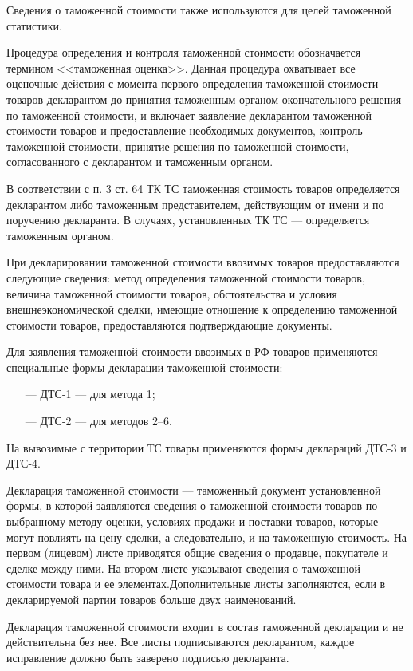 Сведения о таможенной стоимости также используются для целей таможенной статистики.

Процедура определения и контроля таможенной стоимости обозначается термином <<таможенная оценка>>. Данная процедура охватывает все оценочные действия с момента первого определения таможенной стоимости товаров декларантом до принятия таможенным органом окончательного решения по таможенной стоимости, и включает заявление декларантом таможенной стоимости товаров и предоставление необходимых документов, контроль таможенной стоимости, принятие решения по таможенной стоимости, согласованного с декларантом и таможенным органом.

В соответствии с п. 3 ст. 64 ТК ТС таможенная стоимость товаров определяется декларантом либо таможенным представителем, действующим от имени и по поручению декларанта. В случаях, установленных ТК ТС --- определяется таможенным органом.

При декларировании таможенной стоимости ввозимых товаров предоставляются следующие сведения: метод определения таможенной стоимости товаров, величина таможенной стоимости товаров, обстоятельства и условия внешнеэкономической сделки, имеющие отношение к определению таможенной стоимости товаров, предоставляются подтверждающие документы.

Для заявления таможенной стоимости ввозимых в РФ товаров применяются специальные формы декларации таможенной стоимости:
\begin{enumerate}
	\item [---] ДТС-1 --- для метода 1;
	\item [---] ДТС-2 --- для методов 2--6.
\end{enumerate}

На вывозимые с территории ТС товары применяются формы деклараций ДТС-3 и ДТС-4.

Декларация таможенной стоимости --- таможенный документ установленной формы, в которой заявляются сведения о таможенной стоимости товаров по выбранному методу оценки, условиях продажи и поставки товаров, которые могут повлиять на цену сделки, а следовательно, и на таможенную стоимость. На первом (лицевом) листе приводятся общие сведения о продавце, покупателе и сделке между ними. На втором листе указывают сведения о таможенной стоимости товара и ее элементах.Дополнительные листы заполняются, если в декларируемой партии товаров больше двух наименований.

Декларация таможенной стоимости входит в состав таможенной  декларации и не действительна без нее. Все листы подписываются декларантом, каждое исправление должно быть заверено подписью декларанта.

